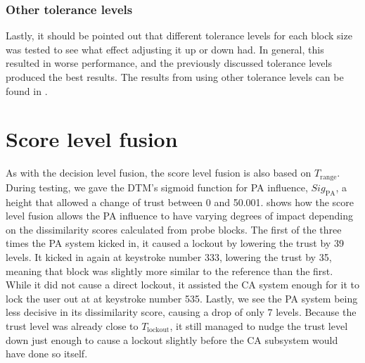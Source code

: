 \subsubsection{Other tolerance levels}
Lastly, it should be pointed out that different tolerance levels for each block size was tested to see what effect adjusting it up or down had.
In general, this resulted in worse performance, and the previously discussed tolerance levels produced the best results.
The results from using other tolerance levels can be found in .

%
%

\section{Score level fusion}
\label{sec:analysis-score-lvl}
As with the decision level fusion, the score level fusion is also based on $T_{\text{range}}$.
During testing, we gave the DTM's sigmoid function for PA influence, $\textit{Sig}_{\text{PA}}$, a height that allowed a change of trust between 0 and 50.001.
 shows how the score level fusion allows the PA influence to have varying degrees of impact depending on the dissimilarity scores calculated from probe blocks.
The first of the three times the PA system kicked in, it caused a lockout by lowering the trust by 39 levels.
It kicked in again at keystroke number 333, lowering the trust by 35, meaning that block was slightly more similar to the reference than the first.
While it did not cause a direct lockout, it assisted the CA system enough for it to lock the user out at at keystroke number 535.
Lastly, we see the PA system being less decisive in its dissimilarity score, causing a drop of only 7 levels.
Because the trust level was already close to $T_{\text{lockout}}$, it still managed to nudge the trust level down just enough to cause a lockout slightly before the CA subsystem would have done so itself.

